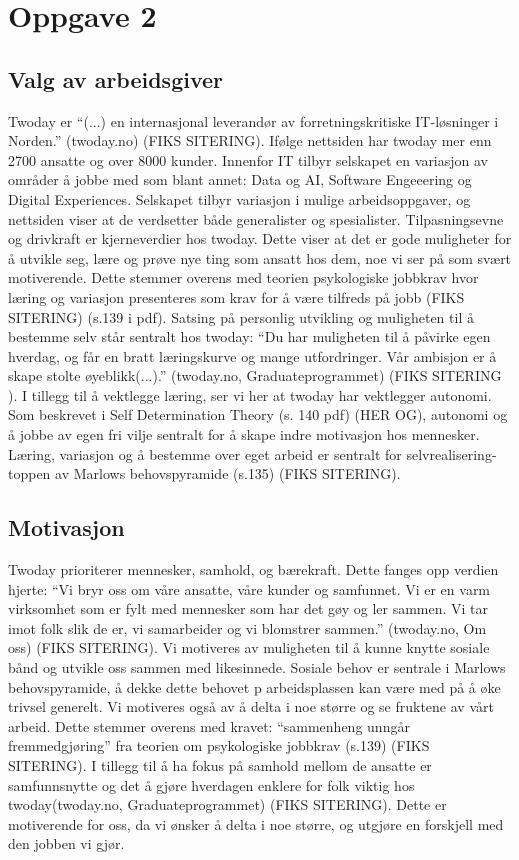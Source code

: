 \section{Oppgave 2}
\subsection{Valg av arbeidsgiver}
Twoday er \enquote{(...) en internasjonal leverandør av forretningskritiske IT-løsninger i Norden.}
(twoday.no) (FIKS SITERING). Ifølge nettsiden har twoday mer enn 2700 ansatte og over 8000 kunder. Innenfor IT
tilbyr selskapet en variasjon av områder å jobbe med som blant annet: Data og AI, Software Engeeering
og Digital Experiences. Selskapet tilbyr variasjon i mulige arbeidsoppgaver, og nettsiden viser at de
verdsetter både generalister og spesialister. Tilpasningsevne og drivkraft er kjerneverdier hos twoday.
Dette viser at det er gode muligheter for å utvikle seg, lære og prøve nye ting som ansatt hos dem,
noe vi ser på som svært motiverende. Dette stemmer overens med teorien psykologiske jobbkrav hvor
læring og variasjon presenteres som krav for å være tilfreds på jobb (FIKS SITERING) (s.139 i pdf). 
Satsing på personlig utvikling og muligheten til å bestemme selv står sentralt hos twoday: \enquote{Du har muligheten
til å påvirke egen hverdag, og får en bratt læringskurve og mange utfordringer. Vår ambisjon er å
skape stolte øyeblikk(...).} (twoday.no, Graduateprogrammet) (FIKS SITERING ). I tillegg til å vektlegge læring, ser
vi her at twoday har vektlegger autonomi. Som beskrevet i Self Determination Theory (s. 140 pdf) (HER OG),
autonomi og å jobbe av egen fri vilje sentralt for å skape indre motivasjon hos mennesker. Læring,
variasjon og å bestemme over eget arbeid er sentralt for selvrealisering-toppen av Marlows
behovspyramide (s.135) (FIKS SITERING).


\subsection{Motivasjon}
Twoday prioriterer mennesker, samhold, og bærekraft. Dette fanges opp verdien hjerte:
“Vi bryr oss om våre ansatte, våre kunder og samfunnet. Vi er en varm virksomhet som er fylt
med mennesker som har det gøy og ler sammen. Vi tar imot folk slik de er, vi samarbeider og vi
blomstrer sammen.” (twoday.no, Om oss) (FIKS SITERING). Vi motiveres av muligheten til å kunne knytte sosiale bånd
og utvikle oss sammen med likesinnede. Sosiale behov er sentrale i Marlows behovspyramide, å dekke
dette behovet p arbeidsplassen kan være med på å øke trivsel generelt. Vi motiveres også av å delta
i noe større og se fruktene av vårt arbeid. Dette stemmer overens med kravet: “sammenheng unngår
fremmedgjøring” fra teorien om psykologiske jobbkrav (s.139) (FIKS SITERING). I tillegg til å ha fokus på samhold
mellom de ansatte er samfunnsnytte og det å gjøre hverdagen enklere for folk viktig hos
twoday(twoday.no, Graduateprogrammet) (FIKS SITERING). Dette er motiverende for oss, da vi ønsker å delta i noe
større, og utgjøre en forskjell med den jobben vi gjør.